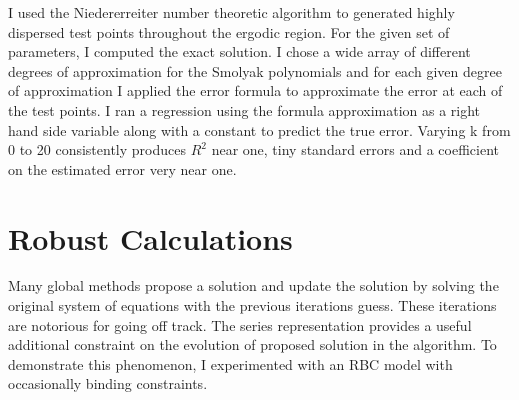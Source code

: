 \documentclass[12pt]{article}
\begin{document}
I used the Niedererreiter number theoretic algorithm to generated highly 
dispersed test points throughout the ergodic region.\cite{niederreiter88,Xu2005}
For the given set of parameters, I computed the exact solution.
I chose a wide array of different degrees of  approximation for the
Smolyak polynomials and for each given degree of approximation I applied
the error formula to approximate the error at each of
the test points.  I ran a regression using the formula approximation as a right
hand side variable along with a constant to predict the true error.
Varying k from 0 to 20 consistently  produces $R^2$ near one, tiny standard errors and a coefficient on the estimated error very near one.









  


  


\section{Robust Calculations}

 

Many global methods propose a solution and update the solution by solving
the original system of equations with the previous iterations guess.
These iterations are notorious for going off track.
The series representation provides a useful additional constraint on the 
evolution of proposed solution in the algorithm.
To demonstrate this phenomenon, 
I experimented with an RBC model with occasionally binding constraints.
\end{document}
